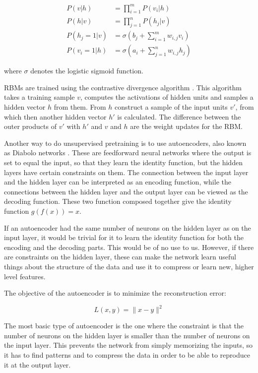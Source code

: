 \begin{align*}
	P(v|h) &= \prod_{i=1}^m P(v_i|h) \\
	P(h|v) &= \prod_{j=1}^n P(h_j|v) \\
	P(h_j=1|v) &= \sigma \left(b_j + \sum_{i=1}^m w_{i,j} v_i \right) \\ 
	P(v_i=1|h) &= \sigma \left(a_i + \sum_{j=1}^n w_{i,j} h_j \right)
\end{align*}

where $ \sigma $ denotes the logistic sigmoid function.

RBMs are trained using the contrastive divergence algorithm \cite{hinton2002training}. This algorithm takes a training sample $ v $, computes the activations of hidden units and samples a hidden vector $h$ from them. From $h$ construct a sample of the input units $ v'$, from which then another hidden vector $ h' $ is calculated. The difference between the outer products of $ v' $ with $ h' $ and $ v $ and $ h $ are the weight updates for the RBM. 

Another way to do unsupervised pretraining is to use autoencoders, also known as Diabolo networks \cite{bengio2009learning} . These are feedforward neural networks where the output is set to equal the input, so that they learn the identity function, but the hidden layers have certain constraints on them. The connection between the input layer and the hidden layer can be interpreted as an encoding function, while the connections between the hidden layer and the output layer can be viewed as the decoding function. These two function composed together give the identity function $ g(f(x)) = x $. 

If an autoencoder had the same number of neurons on the hidden layer as on the input layer, it would be trivial for it to learn the identity function for both the encoding and the decoding parts. This would be of no use to us. However, if there are constraints on the hidden layer, these can make the network learn useful things about the structure of the data and use it to compress or learn new, higher level features. 

The objective of the autoencoder is to minimize the reconstruction error:

\[
	L(x, y) = \|x-y\|^2
\]

The most basic type of autoencoder is the one where the constraint is that the number of neurons on the hidden layer is smaller than the number of neurons on the input layer. This prevents the network from simply memorizing the inputs, so it has to find patterns and to compress the data in order to be able to reproduce it at the output layer. 

